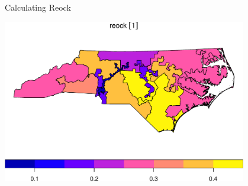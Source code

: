 \documentclass[11pt,ignorenonframetext,]{beamer}
\newenvironment{Shaded}{}{}
\newcommand{\DataTypeTok}[1]{\textcolor[rgb]{0.56,0.13,0.00}{#1}}
\newcommand{\KeywordTok}[1]{\textcolor[rgb]{0.00,0.44,0.13}{\textbf{#1}}}
\newcommand{\NormalTok}[1]{#1}
\newcommand{\OperatorTok}[1]{\textcolor[rgb]{0.40,0.40,0.40}{#1}}
\newcommand{\StringTok}[1]{\textcolor[rgb]{0.25,0.44,0.63}{#1}}
\let\oldShaded\Shaded
\let\endoldShaded\endShaded
\renewenvironment{Shaded}{\footnotesize\begin{spacing}{0.9}\oldShaded}{\endoldShaded\end{spacing}}
\begin{document}
\begin{frame}[fragile]{Calculating Reock}
\protect\hypertarget{calculating-reock}{}

\begin{Shaded}
\end{Shaded}

\begin{center}\includegraphics[width=0.8\textwidth]{Lec16_files/figure-beamer/unnamed-chunk-38-1} \end{center}

\end{frame}
\end{document}
